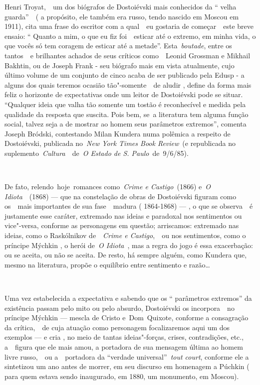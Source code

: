 Henri Troyat,~~um dos biógrafos de Dostoiévski mais conhecidos da ``
velha guarda''~~( a propósito, ele também era russo, tendo nascido em
Moscou em 1911), cita uma frase do escritor com a qual~~eu gostaria de
começar~~este breve ensaio: `` Quanto a mim, o que eu fiz foi~~esticar
até o extremo, em minha vida, o que vocês só tem coragem de esticar até
a metade''. Esta~\emph{boutade}, entre os tantos~~e brilhantes achados
de seus críticos como~~Leonid Grossman e Mikhail Bakhtin, ou de Joseph
Frank - seu biógrafo mais em vista atualmente, cujo último volume de um
conjunto de cinco acaba de ser publicado pela Edusp - a alguns dos quais
teremos ocasião tão"-somente~~de aludir , define da forma mais feliz o
horizonte de expectativas onde um leitor de Dostoiévski pode se situar.
``Qualquer ideia que valha tão somente um tostão é reconhecível e medida
pela qualidade da resposta que suscita. Pois bem, se~a literatura tem
alguma função social, talvez seja a de mostrar ao homem seus parâmetros
extremos'', comenta Joseph Bródski, contestando Milan Kundera numa
polêmica a respeito de Dostoiévski, publicada no~\emph{New York Times
Book Review}~(e republicada no suplemento~\emph{Cultura~}~de~\emph{O
Estado de S. Paulo}~de~9/6/85).

~

De fato, relendo~hoje~romances como~\emph{Crime e Castigo~}(1866)
e~\emph{O Idiota}~~(1868) --- que na constelação de obras de Dostoiévski
figuram como os~~mais importantes de sua fase~~madura ( 1864-1868) ---
, o que se observa~~é justamente esse caráter, extremado nas ideias e
paradoxal nos sentimentos ou vice"-versa, conforme as personagens em
questão; arriscamos: extremado nas ideias, como o Raskólnikov
de~~\emph{Crime e Castigo},~\emph{~}ou nos sentimentos, como o príncipe
Mýchkin , o herói de~\emph{O Idiota}~, mas a regra do jogo é essa
exacerbação: ou se aceita, ou não se aceita. De resto, há sempre alguém,
como Kundera que, mesmo na literatura, propõe o equilíbrio entre
sentimento e razão\ldots{}

~

Uma vez estabelecida a expectativa e sabendo que os `` parâmetros
extremos'' da existência passam pelo mito ou pelo absurdo, Dostoiévski
os incorpora~~no príncipe Mýchkin --- mescla de Cristo e~Dom~Quixote,
conforme a consagração da crítica,~~de cuja atuação como personagem
focalizaremos aqui um dos exemplos --- e cria , no meio de tantas
ideias"-forças, crises, contradições, etc., a~~figura que ele mais amou,
a portadora de sua mensagem última ao homem livre russo,~~ou
a~~portadora da ``verdade universal''~\emph{tout court}, conforme ele a
sintetizou um ano antes de morrer, em seu discurso em homenagem a
Púchkin ( para quem estava sendo inaugurado, em 1880, um monumento, em
Moscou).

